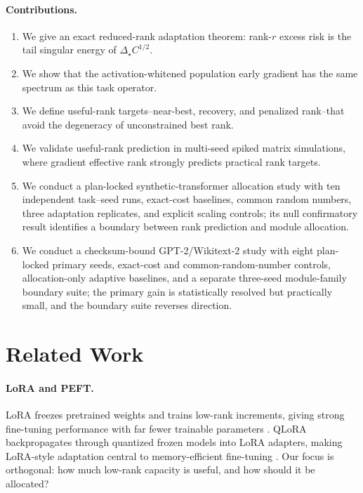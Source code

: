 \documentclass[10pt,twocolumn]{article}
\theoremstyle{definition}
\begin{document}
\paragraph{Contributions.}
\begin{enumerate}[leftmargin=1.4em,itemsep=1pt]
    \item We give an exact reduced-rank adaptation theorem: rank-$r$ excess risk is the tail singular energy of $\Delta_\star C^{1/2}$.
    \item We show that the activation-whitened population early gradient has the same spectrum as this task operator.
    \item We define useful-rank targets--near-best, recovery, and penalized rank--that avoid the degeneracy of unconstrained best rank.
    \item We validate useful-rank prediction in multi-seed spiked matrix simulations, where gradient effective rank strongly predicts practical rank targets.
    \item We conduct a plan-locked synthetic-transformer allocation study with ten independent task--seed runs, exact-cost baselines, common random numbers, three adaptation replicates, and explicit scaling controls; its null confirmatory result identifies a boundary between rank prediction and module allocation.
    \item We conduct a checksum-bound GPT-2/Wikitext-2 study with eight plan-locked primary seeds, exact-cost and common-random-number controls, allocation-only adaptive baselines, and a separate three-seed module-family boundary suite; the primary gain is statistically resolved but practically small, and the boundary suite reverses direction.
\end{enumerate}

\section{Related Work}
\label{sec:related}

\paragraph{LoRA and PEFT.}
LoRA freezes pretrained weights and trains low-rank increments, giving strong fine-tuning performance with far fewer trainable parameters \cite{hu2021lora}.  QLoRA backpropagates through quantized frozen models into LoRA adapters, making LoRA-style adaptation central to memory-efficient fine-tuning \cite{dettmers2023qlora}.  Our focus is orthogonal: how much low-rank capacity is useful, and how should it be allocated?
\end{document}

